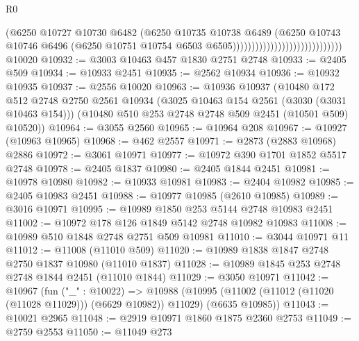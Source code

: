 \begin{lexlean}{R0}
\begin{coremodule}
                                                      (@6250
                                                        @10727
                                                        @10730
                                                        @6482
                                                        (@6250
                                                          @10735
                                                          @10738
                                                          @6489
                                                          (@6250
                                                            @10743
                                                            @10746
                                                            @6496
                                                            (@6250
                                                              @10751
                                                              @10754
                                                              @6503
                                                              @6505)))))))))))))))))))))))))))))
    @10020
@10932 := @3003 @10463 @457 @1830 @2751 @2748
@10933 := @2405 @509
@10934 := @10933 @2451
@10935 := @2562 @10934
@10936 := @10932 @10935
@10937 := @2556 @10020
@10963 := @10936
    @10937
    (@10480
      @172
      @512
      @2748
      @2750
      @2561
      @10934
      (@3025 @10463 @154 @2561 (@3030 (@3031 @10463 @154)))
      (@10480 @510 @253 @2748 @2748 @509 @2451 (@10501 @509) @10520))
@10964 := @3055 @2560
@10965 := @10964 @208
@10967 := @10927 (@10963 @10965)
@10968 := @462 @2557
@10971 := @2873 (@2883 @10968) @2886
@10972 := @3061 @10971
@10977 := @10972 @390 @1701 @1852 @5517 @2748
@10978 := @2405 @1837
@10980 := @2405 @1844 @2451
@10981 := @10978 @10980
@10982 := @10933 @10981
@10983 := @2404 @10982
@10985 := @2405 @10983 @2451
@10988 := @10977 @10985 (@2610 @10985)
@10989 := @3016 @10971
@10995 := @10989 @1850 @253 @5144 @2748 @10983 @2451
@11002 := @10972 @178 @126 @1849 @5142 @2748 @10982 @10983
@11008 := @10989 @510 @1848 @2748 @2751 @509 @10981
@11010 := @3044 @10971 @11
@11012 := @11008 (@11010 @509)
@11020 := @10989 @1838 @1847 @2748 @2750 @1837 @10980 (@11010 @1837)
@11028 := @10989 @1845 @253 @2748 @2748 @1844 @2451 (@11010 @1844)
@11029 := @3050 @10971
@11042 := @10967
    (fun ("_" : @10022) =>
    @10988 (@10995 (@11002 (@11012 (@11020 (@11028 @11029))) (@6629 @10982)) @11029) (@6635 @10985))
@11043 := @10021 @2965
@11048 := @2919 @10971 @1860 @1875 @2360 @2753
@11049 := @2759 @2553
@11050 := @11049 @273

\end{coremodule}
\end{lexlean}
